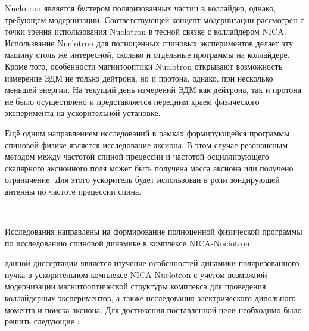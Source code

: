\par Nuclotron является бустером поляризованных частиц в коллайдер, однако, требующем модернизации. Соответствующей концепт модернизации рассмотрен с точки зрения использования Nuclotron в тесной связке с коллайдером NICA.
Использвание Nuclotron для полноценных спиновых экспериментов делает эту машину столь же интересной, сколько и отдельные программы на коллайдере. 
Кроме того, особенности магнитооптики Nuclotron открывают возможность измерение ЭДМ не только дейтрона, но и протона, однако, при несколько меньшей энергии. На текущий день измерений ЭДМ как дейтрона, так и протона не было осуществлено и представляется передним краем физического эксперимента на ускорительной установке.

\par Ещё одним направлением исследований в рамках формирующейся программы спиновой физике является исследование аксиона. В этом случае резонансным методом между частотой спиной прецессии и частотой осциллирующего скалярного аксионного поля может быть получена масса аксиона или получено ограничение. Для этого ускоритель будет использован в роли зондирующей антенны по частоте прецессии спина.

~\\
\par {\actuality} Исследования направлены на формирование полноценной физической программы по исследованию спиновой динамике в комплексе NICA-Nuclotron.
~\\
\par {\aim} данной диссертации является изучение 
особенностей динамики поляризованного пучка в ускорительном 
комплексе NICA-Nuclotron с учетом возможной модернизации 
магнитооптической структуры комплекса для проведения коллайдерных экспериментов, а также исследования 
электрического дипольного момента и поиска аксиона.
Для достижения поставленной цели необходимо было 
решить следующие {\tasks}:

